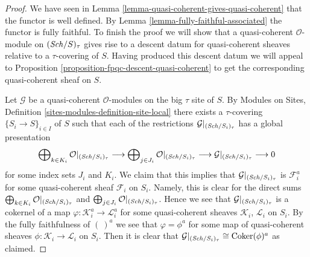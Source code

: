\begin{proof}
We have seen in Lemma \ref{lemma-quasi-coherent-gives-quasi-coherent}
that the functor is well defined. By Lemma \ref{lemma-fully-faithful-associated}
the functor is fully faithful. To finish the proof we will show that a
quasi-coherent $\mathcal{O}$-module on $(\mathit{Sch}/S)_\tau$ gives
rise to a descent datum for quasi-coherent sheaves relative to a
$\tau$-covering of $S$. Having produced this descent datum we will appeal
to Proposition \ref{proposition-fpqc-descent-quasi-coherent} to get the
corresponding quasi-coherent sheaf on $S$.

\medskip\noindent
Let $\mathcal{G}$ be a quasi-coherent $\mathcal{O}$-modules on
the big $\tau$ site of $S$. By
Modules on Sites, Definition \ref{sites-modules-definition-site-local}
there exists a $\tau$-covering $\{S_i \to S\}_{i \in I}$ of $S$
such that each of the restrictions
$\mathcal{G}|_{(\mathit{Sch}/S_i)_\tau}$ has a global presentation
$$
\bigoplus\nolimits_{k \in K_i} \mathcal{O}|_{(\mathit{Sch}/S_i)_\tau}
\longrightarrow
\bigoplus\nolimits_{j \in J_i} \mathcal{O}|_{(\mathit{Sch}/S_i)_\tau}
\longrightarrow
\mathcal{G}|_{(\mathit{Sch}/S_i)_\tau} \longrightarrow 0
$$
for some index sets $J_i$ and $K_i$. We claim that this implies
that $\mathcal{G}|_{(\mathit{Sch}/S_i)_\tau}$ is $\mathcal{F}_i^a$
for some quasi-coherent sheaf $\mathcal{F}_i$ on $S_i$. Namely,
this is clear for the direct sums
$\bigoplus\nolimits_{k \in K_i} \mathcal{O}|_{(\mathit{Sch}/S_i)_\tau}$
and
$\bigoplus\nolimits_{j \in J_i} \mathcal{O}|_{(\mathit{Sch}/S_i)_\tau}$.
Hence we see that $\mathcal{G}|_{(\mathit{Sch}/S_i)_\tau}$ is a
cokernel of a map $\varphi : \mathcal{K}_i^a \to \mathcal{L}_i^a$
for some quasi-coherent sheaves $\mathcal{K}_i$, $\mathcal{L}_i$
on $S_i$. By the fully faithfulness of $(\ )^a$ we see that
$\varphi = \phi^a$ for some map of quasi-coherent sheaves
$\phi : \mathcal{K}_i \to \mathcal{L}_i$ on $S_i$. Then it is
clear that
$\mathcal{G}|_{(\mathit{Sch}/S_i)_\tau} \cong \mathop{\mathrm{Coker}}(\phi)^a$
as claimed.


\end{proof}
